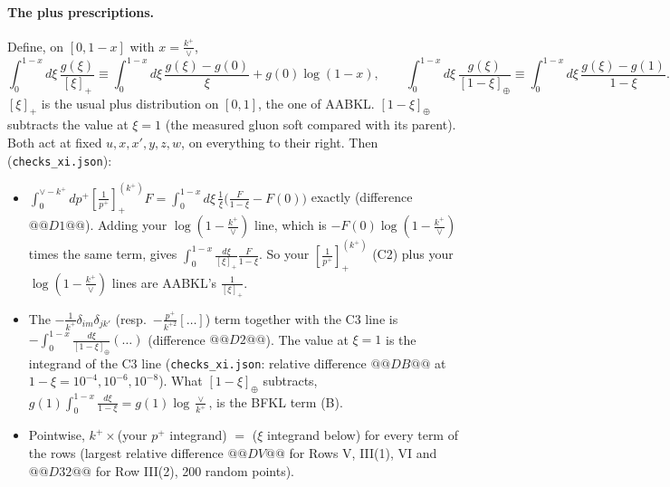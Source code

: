 \documentclass[9pt]{article}
\numberwithin{equation}{section}
\begin{document}
\paragraph{The plus prescriptions.} Define, on $[0,1-x]$ with $x=\frac{k^+}{\vee}$,
\begin{equation}
\int_0^{1-x}\!d\xi\,\frac{g(\xi)}{[\xi]_+}\equiv\int_0^{1-x}\!d\xi\,\frac{g(\xi)-g(0)}{\xi}+g(0)\log(1-x),\qquad
\int_0^{1-x}\!d\xi\,\frac{g(\xi)}{[1-\xi]_\oplus}\equiv\int_0^{1-x}\!d\xi\,\frac{g(\xi)-g(1)}{1-\xi}.
\end{equation}
$[\xi]_+$ is the usual plus distribution on $[0,1]$, the one of AABKL. $[1-\xi]_\oplus$ subtracts the value at $\xi=1$ (the measured gluon soft compared with its parent). Both act at fixed $u,x,x',y,z,w$, on everything to their right. Then (\texttt{checks\_xi.json}):
\begin{itemize}
\item $\int_0^{\vee-k^+}\!dp^+\left[\frac{1}{p^+}\right]_+^{(k^+)}F=\int_0^{1-x}d\xi\,\frac{1}{\xi}\Big(\frac{F}{1-\xi}-F(0)\Big)$ exactly (difference $@@D1@@$). Adding your $\log(1-\frac{k^+}{\vee})$ line, which is $-F(0)\log(1-\frac{k^+}{\vee})$ times the same term, gives $\int_0^{1-x}\frac{d\xi}{[\xi]_+}\frac{F}{1-\xi}$. So your $\left[\frac{1}{p^+}\right]_+^{(k^+)}$ (C2) plus your $\log(1-\frac{k^+}{\vee})$ lines are AABKL's $\frac{1}{[\xi]_+}$.
\item The $-\frac{1}{k^+}\delta_{im}\delta_{jk'}$ (resp.\ $-\frac{p^+}{k^{+2}}[\dots]$) term together with the C3 line is $-\int_0^{1-x}\frac{d\xi}{[1-\xi]_\oplus}(\dots)$ (difference $@@D2@@$). The value at $\xi=1$ is the integrand of the C3 line (\texttt{checks\_xi.json}: relative difference $@@DB@@$ at $1-\xi=10^{-4},10^{-6},10^{-8}$). What $[1-\xi]_\oplus$ subtracts, $g(1)\int_0^{1-x}\frac{d\xi}{1-\xi}=g(1)\log\frac{\vee}{k^+}$, is the BFKL term (B).
\item Pointwise, $k^+\times$(your $p^+$ integrand) $=$ ($\xi$ integrand below) for every term of the rows (largest relative difference $@@DV@@$ for Rows V, III(1), VI and $@@D32@@$ for Row III(2), 200 random points).
\end{itemize}
\end{document}
